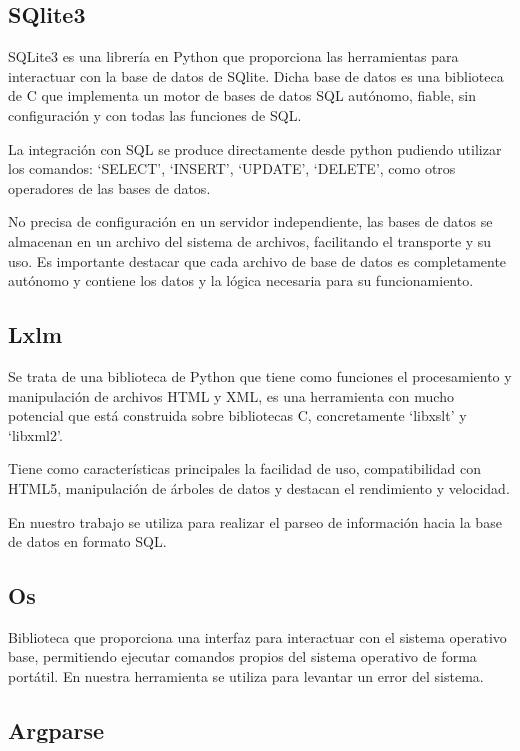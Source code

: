 \documentclass[a4paper, 12pt]{book}
\begin{document}
\subsection{SQlite3}

SQLite3 es una librería en Python que proporciona las herramientas para interactuar con la base de datos de SQlite. Dicha base de datos es una biblioteca de C que implementa un motor de bases de datos SQL autónomo, fiable, sin configuración y con todas las funciones de SQL.

La integración con SQL se produce directamente desde python pudiendo utilizar los comandos: `SELECT', `INSERT', `UPDATE', `DELETE', como otros operadores de las bases de datos.

No precisa de configuración en un servidor independiente, las bases de datos se almacenan en un archivo del sistema de archivos, facilitando el transporte y su uso. Es importante destacar que cada archivo de base de datos es completamente autónomo y contiene los datos y la lógica necesaria para su funcionamiento.

\subsection{Lxlm}

Se trata de una biblioteca de Python que tiene como funciones el procesamiento y manipulación de archivos HTML y XML, es una herramienta con mucho potencial que está construida sobre bibliotecas C, concretamente `libxslt' y `libxml2'.

Tiene como características principales la facilidad de uso, compatibilidad con HTML5, manipulación de árboles de datos y destacan el rendimiento y velocidad.

En nuestro trabajo se utiliza para realizar el parseo de información hacia la base de datos en formato SQL.

\subsection{Os}

Biblioteca que proporciona una interfaz para interactuar con el sistema operativo base, permitiendo ejecutar comandos propios del sistema operativo de forma portátil. En nuestra herramienta se utiliza para levantar un error del sistema.

\subsection{Argparse}
\end{document}
